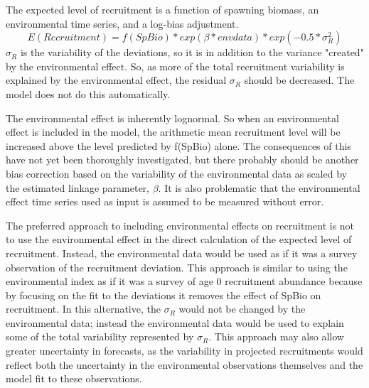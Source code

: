 The expected level of recruitment is a function of spawning biomass, an environmental time series, and a log-bias adjustment.
\begin{equation}
	E(Recruitment) = f(SpBio) * exp(\beta*envdata) * exp(-0.5*\sigma_R^2)
\end{equation}
$\sigma_R$ is the variability of the deviations, so it is in addition to the variance "created" by the environmental effect.  So, as more of the total recruitment variability is explained by the environmental effect, the residual $\sigma_R$ should be decreased.  The model does not do this automatically.

The environmental effect is inherently lognormal.  So when an environmental effect is included in the model, the arithmetic mean recruitment level will be increased above the level predicted by f(SpBio) alone.  The consequences of this have not yet been thoroughly investigated, but there probably should be another bias correction based on the variability of the environmental data as scaled by the estimated linkage parameter, $\beta$.  It is also problematic that the environmental effect time series used as input is assumed to be measured without error.

The preferred approach to including environmental effects on recruitment is not to use the environmental effect in the direct calculation of the expected level of recruitment.  Instead, the environmental data would be used as if it was a survey observation of the recruitment deviation.  This approach is similar to using the environmental index as if it was a survey of age 0 recruitment abundance because by focusing on the fit to the deviations it removes the effect of SpBio on recruitment.  In this alternative, the $\sigma_R$ would not be changed by the environmental data; instead the environmental data would be used to explain some of the total variability represented by $\sigma_R$.  This approach may also allow greater uncertainty in forecasts, as the variability in projected recruitments would reflect both the uncertainty in the environmental observations themselves and the model fit to these observations.

